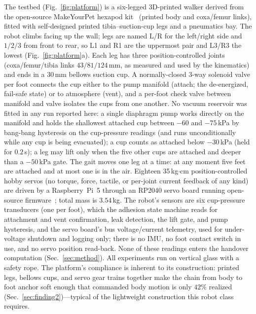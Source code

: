 \documentclass[journal]{IEEEtran}
\begin{document}
The testbed (Fig.~\ref{fig:platform}) is a six-legged 3D-printed
walker derived from the open-source MakeYourPet hexapod
kit~\cite{makeyourpet2022hexapod} (printed
body and coxa/femur links), fitted with self-designed printed
tibia--suction-cup legs and a pneumatics bay. The robot climbs facing
up the wall; legs are named L/R for the left/right side and $1/2/3$
from front to rear, so L1 and R1 are the uppermost pair and L3/R3 the
lowest (Fig.~\ref{fig:platform}a). Each leg has three
position-controlled joints (coxa/femur/tibia links $43/81/124$\,mm, as
measured and used by the kinematics) and ends in a 30\,mm bellows
suction cup. A normally-closed 3-way solenoid valve per foot connects
the cup either to the pump manifold (attach; the de-energized,
fail-safe state) or to atmosphere (vent), and a per-foot check valve
between manifold and valve isolates the cups from one another. No
vacuum reservoir was fitted in any run reported here: a single
diaphragm pump works directly on the manifold and holds the shallowest
attached cup between $-60$ and $-75$\,kPa by bang-bang hysteresis on
the cup-pressure readings (and runs unconditionally while any cup is
being evacuated); a cup counts as attached below $-30$\,kPa (held for
$0.2$\,s); a leg may lift only when the five other cups are attached
and deeper than a $-50$\,kPa gate. The gait moves one leg at a time:
at any moment five feet are attached and at most one is in the air.
Eighteen 35\,kg$\cdot$cm position-controlled hobby servos (no torque,
force, tactile, or per-joint current feedback of any kind) are driven
by a Raspberry~Pi~5 through an RP2040 servo board running open-source
firmware~\cite{carrera_chica}; total mass is
$3.54$\,kg. The robot's
sensors are six cup-pressure transducers (one per foot), which the
adhesion state machine reads for attachment and vent confirmation,
leak detection, the lift gate, and pump hysteresis, and the servo
board's bus voltage/current telemetry, used for under-voltage shutdown
and logging only; there is no IMU, no foot contact switch in use, and
no servo position read-back. None of these readings enters the
handover computation (Sec.~\ref{sec:method}). All experiments run on
vertical glass with a safety rope. The platform's
compliance is inherent to its construction: printed legs, bellows cups, and servo
gear trains together make the chain from body to foot anchor soft
enough that commanded body motion is only $42\%$ realized
(Sec.~\ref{sec:finding2})---typical of the lightweight construction
this robot class requires.
\end{document}
